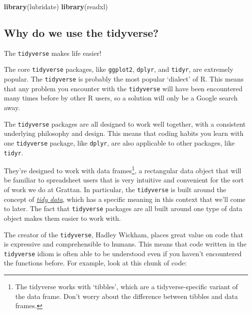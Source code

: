 \documentclass[]{book}
\newenvironment{Shaded}{\begin{snugshade}}{\end{snugshade}}
\newcommand{\KeywordTok}[1]{\textcolor[rgb]{0.13,0.29,0.53}{\textbf{#1}}}
\newcommand{\NormalTok}[1]{#1}
\begin{document}
\begin{Shaded}
\begin{Highlighting}[]
\KeywordTok{library}\NormalTok{(lubridate)}
\KeywordTok{library}\NormalTok{(readxl)}
\end{Highlighting}
\end{Shaded}

\hypertarget{why-do-we-use-the-tidyverse}{%
\subsection{Why do we use the tidyverse?}\label{why-do-we-use-the-tidyverse}}

The \texttt{tidyverse} makes life easier!

The core \texttt{tidyverse} packages, like \texttt{ggplot2}, \texttt{dplyr}, and \texttt{tidyr}, are extremely popular. The \texttt{tidyverse} is probably the most popular `dialect' of R. This means that any problem you encounter with the \texttt{tidyverse} will have been encountered many times before by other R users, so a solution will only be a Google search away.

The \texttt{tidyverse} packages are all designed to work well together, with a consistent underlying philosophy and design. This means that coding habits you learn with one \texttt{tidyverse} package, like \texttt{dplyr}, are also applicable to other packages, like \texttt{tidyr}.

They're designed to work with data frames\footnote{The tidyverse works with `tibbles', which are a tidyverse-specific variant of the data frame. Don't worry about the difference between tibbles and data frames.}, a rectangular data object that will be familiar to spreadsheet users that is very intuitive and convenient for the sort of work we do at Grattan. In particular, the \texttt{tidyverse} is built around the concept of \href{https://cran.r-project.org/web/packages/tidyr/vignettes/tidy-data.html}{\emph{tidy data}}, which has a specific meaning in this context that we'll come to later. The fact that \texttt{tidyverse} packages are all built around one type of data object makes them easier to work with.

The creator of the \texttt{tidyverse}, Hadley Wickham, places great value on code that is expressive and comprehensible to humans. This means that code written in the \texttt{tidyverse} idiom is often able to be understood even if you haven't encountered the functions before. For example, look at this chunk of code:
\end{document}
